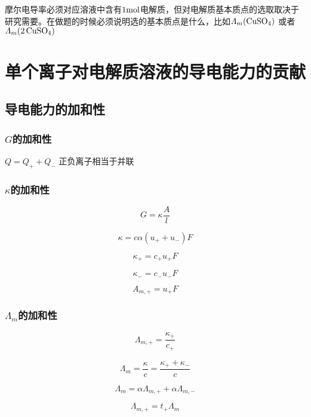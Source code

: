     摩尔电导率必须对应溶液中含有$1 \mathrm{mol}$电解质，但对电解质基本质点的选取取决于研究需要。在做题的时候必须说明选的基本质点是什么，比如$\varLambda_m (\ce{CuSO4})$ 或者 $\varLambda_m (\ce{2CuSO4})$

    \section{单个离子对电解质溶液的导电能力的贡献}

    \subsection{导电能力的加和性}

    \subsubsection{$G$的加和性}

    $Q = Q_+ + Q_-$ 正负离子相当于并联

    \subsubsection{$\kappa$的加和性}

    \[
        G = \kappa \frac{A}{l}  
    \]

    \[
        \kappa = c\alpha(u_+ + u_-)F  
    \]

    \[
        \kappa_+ = c_+ u_+ F  
    \]

    \[
        \kappa_- = c_- u_- F  
    \]

    \begin{equation*}
        A_{m,+} = u_+ F
    \end{equation*}

    \subsubsection{$\varLambda_m$的加和性}

    \begin{definition}
        \[
            \varLambda_{m, +} = \frac{\kappa_+}{c_+}  
        \]
    \end{definition}

    \[
        \varLambda_m = \frac{\kappa}{c} = \frac{\kappa_+ + \kappa_-}{c}  
    \]

    \[
        \varLambda_m = \alpha \varLambda_{m, +} + \alpha \varLambda_{m, -}
    \]

    \[
        \varLambda_{m, +} = t_+ \varLambda_{m}  
    \]

